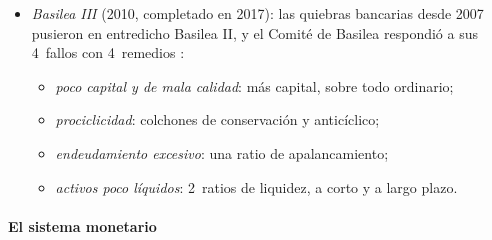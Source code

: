 \documentclass[11pt]{article}
\begin{document}
\begin{itemize}
\begin{itemize}
  \item requisitos de capital más altos, sobre todo para los bancos sistémicos (\emph{demasiado grandes para caer});
  \item regímenes de resolución bancaria con recapitalización interna, que convierte deuda en capital para que las pérdidas no las pague el contribuyente;
  \item la reforma de los derivados extrabursátiles, con compensación centralizada;
  \item menos dependencia de las agencias de calificación;
  \item la convergencia de las normas contables;
  \item la lucha contra el blanqueo de capitales y la financiación del terrorismo;
  \item la regulación y supervisión de la intermediación financiera no bancaria (la banca en la sombra).
  \end{itemize}
\item \emph{Basilea III} (2010, completado en 2017): las quiebras bancarias desde 2007 pusieron en entredicho Basilea II, y el Comité de Basilea respondió a sus 4~fallos con 4~remedios\nocite{BCBS2017Basel3} :
  \begin{itemize}
  \item \emph{poco capital y de mala calidad}: más capital, sobre todo ordinario;
  \item \emph{prociclicidad}: colchones de conservación y anticíclico;
  \item \emph{endeudamiento excesivo}: una ratio de apalancamiento;
  \item \emph{activos poco líquidos}: 2~ratios de liquidez, a corto y a largo plazo.
  \end{itemize}
\end{itemize}

\paragraph{El sistema monetario}
\end{document}
